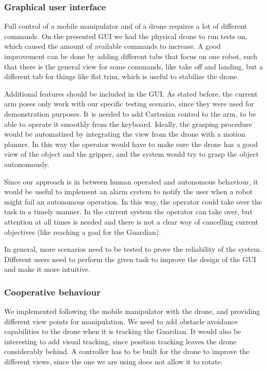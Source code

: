 \documentclass[11pt,a4paper]{article}
\begin{document}
\subsubsection{Graphical user interface}
Full control of a mobile manipulator and of a drone requires a lot of different commands. On the presented GUI we had the physical drone to run tests on, which caused the amount of available commands to increase. A good improvement can be done by adding different tabs that focus on one robot, such that there is the general view for some commands, like take off and landing, but a different tab for things like flat trim,  which is useful to stabilize the drone. 

Additional features should be included in the GUI. As stated before, the current arm poses only work with our specific testing scenario, since they were used for demonstration purposes. It is needed to add Cartesian control to the arm, to be able to operate it smoothly from the keyboard. 
Ideally, the grasping procedure would be automatized by integrating the view from the drone with a motion planner. In this way the operator would have to make sure the drone has a good view of the object and the gripper, and the system would try to grasp the object autonomously.

Since our approach is in between human operated and autonomous behaviour, it would be useful to implement an alarm system to notify the user when a robot might fail an autonomous operation. In this way, the operator could take over the task in a timely manner. In the current system the operator can take over, but attention at all times is needed and there is not a clear way of cancelling current objectives (like reaching a  goal for the Guardian).

In general, more scenarios need to be tested to prove the reliability of the system. Different users need to perform the given task to improve the design of the GUI and make it more intuitive.

\subsubsection{Cooperative behaviour}

We implemented following the mobile manipulator with the drone, and providing different view points for manipulation. 
We need to add obstacle avoidance capabilities to the drone when it is tracking the Guardian. It would also be interesting to add visual tracking, since position tracking leaves the drone considerably behind.
A controller has to be built for the drone to improve the different views, since the one we are using does  not allow it to rotate.  
\end{document}
